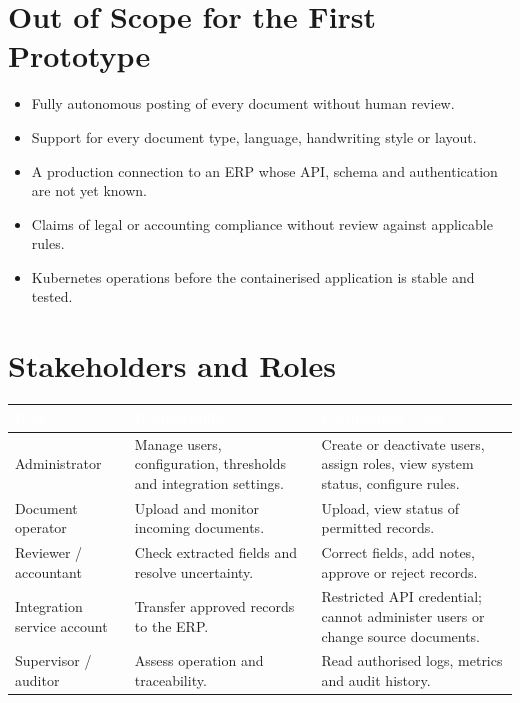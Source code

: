 \documentclass[11pt,a4paper]{report}
\newcommand{\hdr}[1]{\textcolor{white}{\sffamily\bfseries #1}}
\newcommand{\tblstart}{\rowcolors{2}{white}{rowgray}\arrayrulecolor{teal!60}}
\newcommand{\hdrrow}{\rowcolor{navy}}
\begin{document}
\section{Out of Scope for the First Prototype}
\begin{itemize}
\item Fully autonomous posting of every document without human review.
\item Support for every document type, language, handwriting style or layout.
\item A production connection to an ERP whose API, schema and authentication are not yet known.
\item Claims of legal or accounting compliance without review against applicable rules.
\item Kubernetes operations before the containerised application is stable and tested.
\end{itemize}

\section{Stakeholders and Roles}
{\tblstart\small
\begin{longtable}{L{3.0cm}L{4.4cm}L{6.6cm}}
\hdrrow \hdr{Role} & \hdr{Responsibility} & \hdr{Permissions / use}\\ \endhead
Administrator & Manage users, configuration, thresholds and integration settings. & Create or deactivate users, assign roles, view system status, configure rules.\\
Document operator & Upload and monitor incoming documents. & Upload, view status of permitted records.\\
Reviewer / accountant & Check extracted fields and resolve uncertainty. & Correct fields, add notes, approve or reject records.\\
Integration service account & Transfer approved records to the ERP. & Restricted API credential; cannot administer users or change source documents.\\
Supervisor / auditor & Assess operation and traceability. & Read authorised logs, metrics and audit history.\\
\hline
\end{longtable}}
\end{document}
